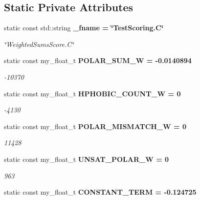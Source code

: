 \subsection*{Static Private Attributes}
\begin{CompactItemize}
\item 
static const std::string \bf{\_\-fname} = \char`\"{}Test\-Scoring.C\char`\"{}\label{classSimSite3D_1_1TestScoring_b4ebe268b1b74f5fe669c109de103c8f}

\begin{CompactList}\small\item\em \char`\"{}Weighted\-Sums\-Score.C\char`\"{} \item\end{CompactList}\item 
static const my\_\-float\_\-t \bf{POLAR\_\-SUM\_\-W} = -0.0140894\label{classSimSite3D_1_1TestScoring_d98e1f35e2bdf736d103e6e5b0acb5dd}

\begin{CompactList}\small\item\em -10370 \item\end{CompactList}\item 
static const my\_\-float\_\-t \bf{HPHOBIC\_\-COUNT\_\-W} = 0\label{classSimSite3D_1_1TestScoring_4d97cb87f8816169344f99d6d82f9910}

\begin{CompactList}\small\item\em -4130 \item\end{CompactList}\item 
static const my\_\-float\_\-t \bf{POLAR\_\-MISMATCH\_\-W} = 0\label{classSimSite3D_1_1TestScoring_346e2d0eab2f073e92340f747237e674}

\begin{CompactList}\small\item\em 11428 \item\end{CompactList}\item 
static const my\_\-float\_\-t \bf{UNSAT\_\-POLAR\_\-W} = 0\label{classSimSite3D_1_1TestScoring_668c7fb952beb31eb9c991e0f736570c}

\begin{CompactList}\small\item\em 963 \item\end{CompactList}\item 
static const my\_\-float\_\-t \bf{CONSTANT\_\-TERM} = -0.124725\label{classSimSite3D_1_1TestScoring_1ee5151bf6450adf872d86f51b9f9e72}


\end{CompactItemize}
